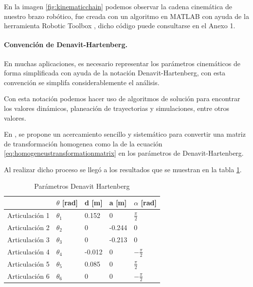 En la imagen \ref{fig:kinematicchain} podemos observar la cadena cinemática de nuestro brazo robótico, fue creada con un algoritmo en MATLAB con ayuda de la herramienta Robotic Toolbox \cite{Corke2017}, dicho código puede consultarse en el Anexo 1.


\paragraph{Convención de Denavit-Hartenberg.} En muchas aplicaciones, es necesario representar los parámetros cinemáticos de forma simplificada con ayuda de la notación Denavit-Hartenberg, con esta convención se simplifa considerablemente el análisis.

Con esta notación podemos hacer uso de algoritmos de solución para encontrar los valores dinámicos, planeación de trayectorias y simulaciones, entre otros valores.

En \cite{Corke2007}, se propone un acercamiento sencillo y sistemático para convertir una matriz de transformación homogenea como la de la ecuación \ref{eq:homogeneustransformationmatrix} en los parámetros de Denavit-Hartenberg. 

Al realizar dicho proceso se llegó a los resultados que se muestran en la tabla \ref{table:denavithartenberg}.

\begin{table}
\centering
\caption{Parámetros Denavit Hartenberg}
 \label{table:denavithartenberg}
\begin{tabular}{l|l|l|l|l|}
               & $\theta$ [rad] & d [m]    & a [m]   & $\alpha$ [rad]                        \\ 
\hline
Articulación 1 & $\theta_1$              & 0.152    & 0       & $\frac{\pi}{2}$   \\
Articulación 2 & $\theta_2$              & 0        & -0.244       & 0 \\
Articulación 3 & $\theta_3$                  & 0 & -0.213       & 0                                                  \\
Articulación 4 & $\theta_4$              & -0.012        & 0 & $-\frac{\pi}{2}$   \\
Articulación 5 & $\theta_5$                        & 0.085        & 0 & $\frac{\pi}{2}$  \\
Articulación 6 & $\theta_6$                           & 0        & 0  & $-\frac{\pi}{2}$                                                 
\end{tabular}
\end{table}

